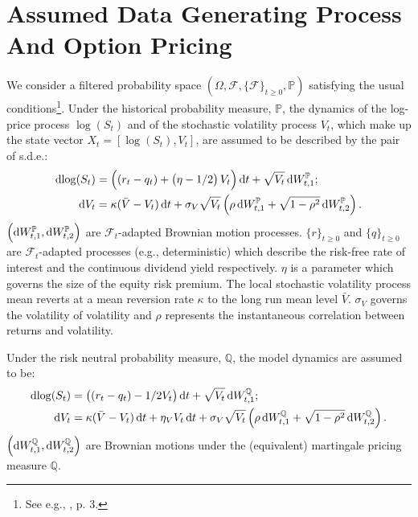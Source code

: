 \documentclass[11pt,a4paper,notitlepage]{article}
\numberwithin{equation}{section}
\begin{document}
\newpage
 
\section{Assumed Data Generating Process And Option Pricing}
We consider a filtered probability space $\left(\Omega, \mathcal{F}, \lbrace\mathcal{F}\rbrace_{t\geq0}, \mathbb{P} \right)$ satisfying the usual conditions\footnote{See e.g., \citet{protterstochastic}, p. 3.}. Under the historical probability measure, $\mathbb{P}$, the dynamics of the log-price process $\log(S_t)$ and of the stochastic volatility process $V_t$, which make up the state vector $X_t = [\log(S_t), V_t]$, are assumed to be described by the pair of s.d.e.:
\begin{align}
	\dif{\log(S_t)} &= \left((r_t-q_t)+ \left(\eta-1/2\right) V_t \right)\dif t + \sqrt{V_t} \dif W_{t,1}^\mathbb{P}; \label{PHestonS}\\
	\dif{V_t} &= \kappa(\bar{V}-V_t)\dif t + \sigma_V\sqrt{V_t}\left(\rho \dif W_{t,1}^\mathbb{P} + \sqrt{1-\rho^2}\dif W_{t,2}^\mathbb{P}\right). \label{PHestonV}
\end{align}
$\left(\dif W_{t,1}^\mathbb{P}, \dif W_{t,2}^\mathbb{P}\right)$ are $\mathcal{F}_t$-adapted Brownian motion processes. $\lbrace r \rbrace_{t\geq 0}$  and  $\lbrace q \rbrace_{t\geq 0}$ are $\mathcal{F}_t$-adapted processes (e.g., deterministic) which describe the risk-free rate of interest and the continuous dividend yield respectively. $\eta$ is a parameter which governs the size of the equity risk premium. The local stochastic volatility process mean reverts at a mean reversion rate $\kappa$ to the long run mean level $\bar{V}$. $\sigma_V$ governs the volatility of volatility and $\rho$ represents the instantaneous correlation between returns and volatility.

Under the risk neutral probability measure, $\mathbb{Q}$, the model dynamics are assumed to be: 
\begin{align}
	\dif{\log(S_t)} &= \left( (r_t-q_t) - 1/2 V_t\right) \dif t + \sqrt{V_t} \dif W_{t,1}^\mathbb{Q};\label{QHestonS}\\
	\dif{V_t} &= \kappa(\bar{V}-V_t)\dif t + \eta_{V}V_t\dif t + \sigma_V\sqrt{V_t}\left(\rho \dif W_{t,1}^\mathbb{Q} + \sqrt{1-\rho^2}\dif W_{t,2}^\mathbb{Q}\right).\label{QHestonV}
\end{align}
$\left(\dif W_{t,1}^\mathbb{Q}, \dif W_{t,2}^\mathbb{Q}\right)$ are Brownian motions under the (equivalent) martingale pricing measure $\mathbb{Q}$.
\end{document}
